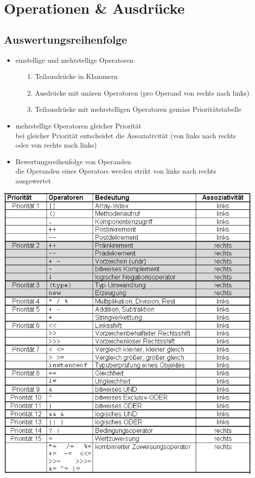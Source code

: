 \documentclass[a4paper,10pt]{article}
\begin{document}
\newpage
\section{Operationen \& Ausdrücke}

\subsection{Auswertungsreihenfolge}
\begin{itemize}
	\item einstellige und mehrstellige Operatoren
		\begin{itemize}
			\item[1.] Teilausdrücke in Klammern
			\item[2.] Ausdrücke mit unären Operatoren (pro Operand von rechts nach links)
			\item[3.] Teilausdrücke mit mehrstelligen Operatoren gemäss Prioritätstabelle
		\end{itemize}
	\item mehrstellige Operatoren gleicher Priorität \\
		bei gleicher Priorität entscheidet die Assoziativität (von links nach rechts oder von rechts nach links)
	\item Bewertungsreihenfolge von Operanden \\
		die Operanden eines Operators werden strikt von links nach rechts ausgewertet
\end{itemize}
\includegraphics[width=150mm]{operatoren_prios.png}
\end{document}
